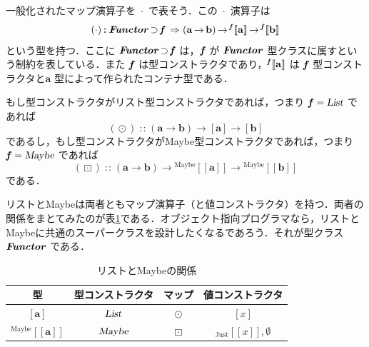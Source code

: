 \documentclass[a5paper,twoside,fleqn,draft]{jsbook}
\def\[{[\![}
\def\]{]\!]}
\DeclareMathOperator{\mSuperClass}{\;\Rightarrow\;}
\DeclareMathOperator{\mSuperSet}{\supset}
\newcommand{\mNothing}{\emptyset}
\DeclareMathOperator{\mFuncArrow}{\rightarrow}
\DeclareMathOperator{\mIn}{{:\!:}}
\DeclareMathOperator{\mMap}{\cdot}
\DeclareMathOperator{\mMapList}{\odot}
\DeclareMathOperator{\mMapMaybe}{\boxdot}
\newcommand{\mType}[1]{\mathbf{#1}} %
\newcommand{\mPolymorphicTypeParameter}[1]{\textbf{\textit{#1}}}
\newcommand{\mA}{\mType{a}}
\newcommand{\mB}{\mType{b}}
\newcommand{\mTypeAssemble}[2]{{}^\mathrm{#1}\[\mType{#2}\]}
\newcommand{\mPolymorphicTypeAssemble}[2]{{}^\mPolymorphicTypeParameter{#1}\[\mType{#2}\]}
\newcommand{\mMaybeType}[1]{\mTypeAssemble{Maybe}{#1}}
\newcommand{\mTypeConstructor}[1]{\textsl{#1}}
\DeclareMathOperator{\mListTypeConstructor}{\mTypeConstructor{List}}
\DeclareMathOperator{\mMaybeTypeConstructor}{\mTypeConstructor{Maybe}}
\newcommand{\mValueConstructor}[1]{\mathrm{#1}}
\newcommand{\mValueWith}[2]{{}_\mValueConstructor{#1}\[#2\]}
\newcommand{\mJustWith}[1]{\mValueWith{Just}{#1}}
\newcommand{\mTypeClass}[1]{\textbf{\textit{#1}}}
\newcommand{\mFunctorTypeClass}{\mTypeClass{Functor}}
\begin{document}
一般化されたマップ演算子を $\mMap$ で表そう．この $\mMap$ 演算子は
\begin{equation}
  (\mMap)
  \mIn{}\mFunctorTypeClass
  \mSuperSet\mPolymorphicTypeParameter{f}
  \mSuperClass(\mA\mFuncArrow\mB)
  \mFuncArrow\mPolymorphicTypeAssemble{f}{a}
  \mFuncArrow\mPolymorphicTypeAssemble{f}{b}
\end{equation}
という型を持つ．ここに $\mFunctorTypeClass\mSuperSet\mPolymorphicTypeParameter{f}$ は，$\mPolymorphicTypeParameter{f}$ が $\mFunctorTypeClass$ 型クラスに属すという制約を表している．また $\mPolymorphicTypeParameter{f}$ は型コンストラクタであり，$\mPolymorphicTypeAssemble{f}{a}$ は $\mPolymorphicTypeParameter{f}$ 型コンストラクタと$\mA$ 型によって作られたコンテナ型である．

もし型コンストラクタがリスト型コンストラクタであれば，つまり $\mPolymorphicTypeParameter{f}=\mListTypeConstructor$ であれば
\begin{equation}
  (\mMapList)
  \mIn{}(\mA\mFuncArrow\mB)\mFuncArrow[\mA]\mFuncArrow[\mB]
\end{equation}
であるし，もし型コンストラクタがMaybe型コンストラクタであれば，つまり
$\mPolymorphicTypeParameter{f}=\mMaybeTypeConstructor$ であれば
\begin{equation}
  (\mMapMaybe)
  \mIn{}(\mA\mFuncArrow\mB)\mFuncArrow\mMaybeType{a}\mFuncArrow\mMaybeType{b}
\end{equation}
である．

リストとMaybeは両者ともマップ演算子（と値コンストラクタ）を持つ．両者の関係をまとてみたのが表\ref{tab:list-and-maybe}である．オブジェクト指向プログラマなら，リストとMaybeに共通のスーパークラスを設計したくなるであろう．それが型クラス $\mFunctorTypeClass$ である．

\begin{table}
\label{tab:list-and-maybe}
\caption{リストとMaybeの関係}
\begin{center}
\begin{tabular}{||c|c|c|c||}\hline
型&型コンストラクタ&マップ&値コンストラクタ\\\hline\hline
$[\mA]$&$\mListTypeConstructor$&$\mMapList$&$[x]$\\
$\mMaybeType{a}$&$\mMaybeTypeConstructor$&$\mMapMaybe$&$\mJustWith{x},\mNothing$\\\hline
\end{tabular}
\end{center}
\end{table}

\end{document}
